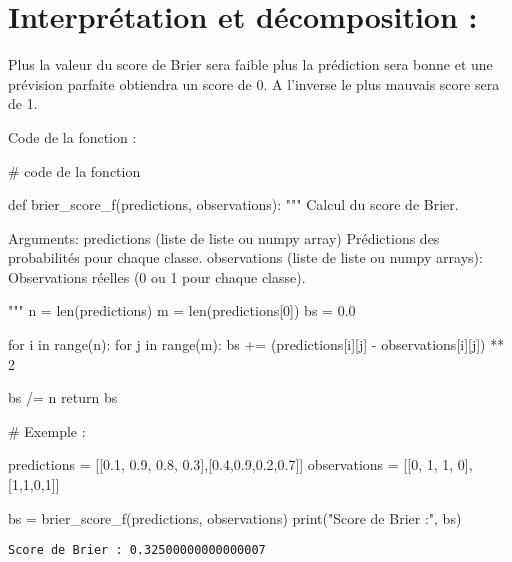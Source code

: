 \documentclass[
  letterpaper,
  DIV=11,
  numbers=noendperiod]{scrartcl}
\newenvironment{Shaded}{\begin{snugshade}}{\end{snugshade}}
\newcommand{\BuiltInTok}[1]{\textcolor[rgb]{0.00,0.23,0.31}{#1}}
\newcommand{\CommentTok}[1]{\textcolor[rgb]{0.37,0.37,0.37}{#1}}
\newcommand{\ControlFlowTok}[1]{\textcolor[rgb]{0.00,0.23,0.31}{#1}}
\newcommand{\DecValTok}[1]{\textcolor[rgb]{0.68,0.00,0.00}{#1}}
\newcommand{\FloatTok}[1]{\textcolor[rgb]{0.68,0.00,0.00}{#1}}
\newcommand{\KeywordTok}[1]{\textcolor[rgb]{0.00,0.23,0.31}{#1}}
\newcommand{\NormalTok}[1]{\textcolor[rgb]{0.00,0.23,0.31}{#1}}
\newcommand{\OperatorTok}[1]{\textcolor[rgb]{0.37,0.37,0.37}{#1}}
\newcommand{\StringTok}[1]{\textcolor[rgb]{0.13,0.47,0.30}{#1}}
\begin{document}
\hypertarget{interpruxe9tation-et-duxe9composition}{%
\section{Interprétation et décomposition
:}\label{interpruxe9tation-et-duxe9composition}}

Plus la valeur du score de Brier sera faible plus la prédiction sera
bonne et une prévision parfaite obtiendra un score de 0. A l'inverse le
plus mauvais score sera de 1.

Code de la fonction :

\begin{Shaded}
\begin{Highlighting}[]
\CommentTok{\# code de la fonction }


\KeywordTok{def}\NormalTok{ brier\_score\_f(predictions, observations):}
    \CommentTok{"""}
\CommentTok{    Calcul du score de Brier.}

\CommentTok{    Arguments:}
\CommentTok{        predictions (liste de liste ou numpy array) Prédictions des probabilités pour chaque classe.}
\CommentTok{        observations (liste de liste ou numpy arrays): Observations réelles (0 ou 1 pour chaque classe).}

\CommentTok{    """}
\NormalTok{    n }\OperatorTok{=} \BuiltInTok{len}\NormalTok{(predictions)}
\NormalTok{    m }\OperatorTok{=} \BuiltInTok{len}\NormalTok{(predictions[}\DecValTok{0}\NormalTok{])}
\NormalTok{    bs }\OperatorTok{=} \FloatTok{0.0}

    \ControlFlowTok{for}\NormalTok{ i }\KeywordTok{in} \BuiltInTok{range}\NormalTok{(n):}
        \ControlFlowTok{for}\NormalTok{ j }\KeywordTok{in} \BuiltInTok{range}\NormalTok{(m):}
\NormalTok{            bs }\OperatorTok{+=}\NormalTok{ (predictions[i][j] }\OperatorTok{{-}}\NormalTok{ observations[i][j]) }\OperatorTok{**} \DecValTok{2}

\NormalTok{    bs }\OperatorTok{/=}\NormalTok{ n}
    \ControlFlowTok{return}\NormalTok{ bs}


\CommentTok{\# Exemple : }

\NormalTok{predictions }\OperatorTok{=}\NormalTok{ [[}\FloatTok{0.1}\NormalTok{, }\FloatTok{0.9}\NormalTok{, }\FloatTok{0.8}\NormalTok{, }\FloatTok{0.3}\NormalTok{],[}\FloatTok{0.4}\NormalTok{,}\FloatTok{0.9}\NormalTok{,}\FloatTok{0.2}\NormalTok{,}\FloatTok{0.7}\NormalTok{]]}
\NormalTok{observations }\OperatorTok{=}\NormalTok{ [[}\DecValTok{0}\NormalTok{, }\DecValTok{1}\NormalTok{, }\DecValTok{1}\NormalTok{, }\DecValTok{0}\NormalTok{],[}\DecValTok{1}\NormalTok{,}\DecValTok{1}\NormalTok{,}\DecValTok{0}\NormalTok{,}\DecValTok{1}\NormalTok{]]}

\NormalTok{bs }\OperatorTok{=}\NormalTok{ brier\_score\_f(predictions, observations)}
\BuiltInTok{print}\NormalTok{(}\StringTok{"Score de Brier :"}\NormalTok{, bs)}
\end{Highlighting}
\end{Shaded}

\begin{verbatim}
Score de Brier : 0.32500000000000007
\end{verbatim}
\end{document}
